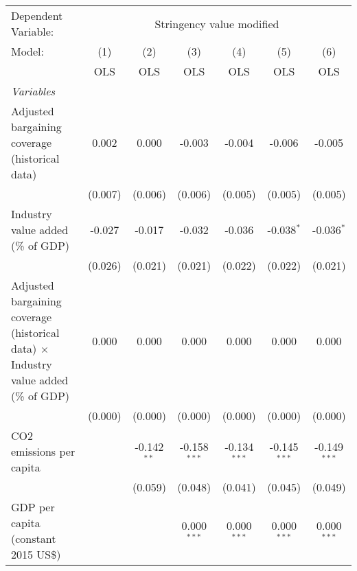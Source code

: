 
\begingroup
\centering
\begin{tabular}{lcccccc}
   \toprule
   Dependent Variable: & \multicolumn{6}{c}{Stringency value modified}\\
   Model:                                                                                     & (1)     & (2)           & (3)            & (4)            & (5)            & (6)\\  
                                                                                              &  OLS    & OLS           & OLS            & OLS            & OLS            & OLS\\  
   \midrule
   \emph{Variables}\\
   Adjusted bargaining coverage (historical data)                                             & 0.002   & 0.000         & -0.003         & -0.004         & -0.006         & -0.005\\   
                                                                                              & (0.007) & (0.006)       & (0.006)        & (0.005)        & (0.005)        & (0.005)\\   
   Industry value added (\% of GDP)                                                           & -0.027  & -0.017        & -0.032         & -0.036         & -0.038$^{*}$   & -0.036$^{*}$\\   
                                                                                              & (0.026) & (0.021)       & (0.021)        & (0.022)        & (0.022)        & (0.021)\\   
   Adjusted bargaining coverage (historical data) $\times$ Industry value added (\% of GDP)   & 0.000   & 0.000         & 0.000          & 0.000          & 0.000          & 0.000\\   
                                                                                              & (0.000) & (0.000)       & (0.000)        & (0.000)        & (0.000)        & (0.000)\\   
   CO2 emissions per capita                                                                   &         & -0.142$^{**}$ & -0.158$^{***}$ & -0.134$^{***}$ & -0.145$^{***}$ & -0.149$^{***}$\\   
                                                                                              &         & (0.059)       & (0.048)        & (0.041)        & (0.045)        & (0.049)\\   
   GDP per capita (constant 2015 US\$)                                                        &         &               & 0.000$^{***}$  & 0.000$^{***}$  & 0.000$^{***}$  & 0.000$^{***}$\\   

\end{tabular}
